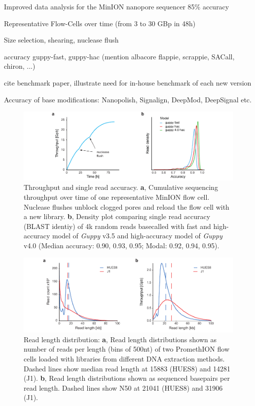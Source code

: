 Improved data analysis for the {MinION} nanopore sequencer \cite{Jain2015} 85\% accuracy

Representative Flow-Cells over time (from 3 to 30 GBp in 48h)

Size selection, shearing, nuclease flush

accuracy guppy-fast, guppy-hac (mention albacore flappie, scrappie, SACall, chiron, ...)

cite benchmark paper, illustrate need for in-house benchmark of each new version

Accuracy of base modifications: Nanopolish, Signalign, DeepMod, DeepSignal etc.


\begin{figure}[h]
    \centering
    \includegraphics[width=1.0\textwidth]{figures/state_of_art/throughput.pdf}
    \captionsetup{format=plain}
    \caption[Throughput and accuracy]{Throughput and single read accuracy. \textbf{a}, Cumulative sequencing throughput over time of one representative MinION flow cell. Nuclease flushes unblock clogged pores and reload the flow cell with a new library. \textbf{b}, Density plot comparing single read accuracy (BLAST identiy) of 4k random reads basecalled with fast and high-accuracy model of \textit{Guppy} v3.5 and high-accuracy model of \textit{Guppy} v4.0 (Median accuracy: 0.90, 0.93, 0.95; Modal: 0.92, 0.94, 0.95).}
    \label{fig:state_of_art:throughput}
\end{figure}

\begin{figure}[h]
    \centering
    \includegraphics[width=1.0\textwidth]{figures/state_of_art/read_length.pdf}
    \captionsetup{format=plain}
    \caption[Read length median and N50]{Read length distribution: \textbf{a}, Read length distributions shown as number of reads per length (bins of 500nt) of two PromethION flow cells loaded with libraries from different DNA extraction methods. Dashed lines show median read length at 15883 (HUES8) and 14281 (J1). \textbf{b}, Read length distributions shown as sequenced basepairs per read length. Dashed lines show N50 at 21041 (HUES8) and 31906 (J1).}
    \label{fig:state_of_art:read_length}
\end{figure}

